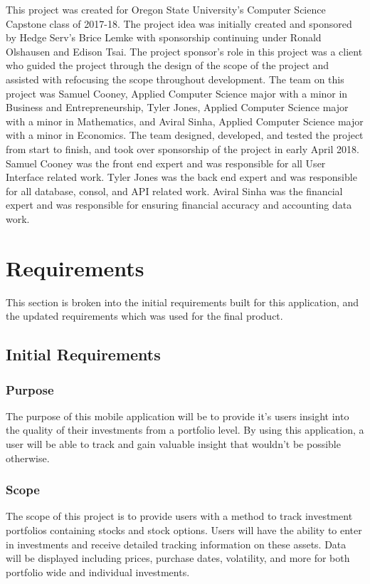 \documentclass[onecolumn, draftclsnofoot,10pt, compsoc]{IEEEtran}
\begin{document}
This project was created for Oregon State University's Computer Science Capstone class of 2017-18. The project idea was initially
created and sponsored by Hedge Serv's Brice Lemke with sponsorship continuing under Ronald Olshausen and Edison Tsai. The project sponsor's role
in  this project was a client who guided the project through the design of the scope of the project and assisted with
refocusing the scope throughout development. The team on this project was Samuel Cooney, Applied Computer Science
major with a minor in Business and Entrepreneurship, Tyler Jones, Applied Computer Science major with a minor in Mathematics, and Aviral Sinha, Applied Computer Science major with a minor in Economics.
The team designed, developed, and tested the project from start to finish, and took over sponsorship of the project in early April 2018.
Samuel Cooney was the front end expert and was responsible for all User Interface related work. Tyler Jones was the back end expert and was
responsible for all database, consol, and API related work. Aviral Sinha was the financial expert and was responsible for ensuring financial
accuracy and accounting data work. 

\section{Requirements}
This section is broken into the initial requirements built for this application, and the updated requirements which was used for the final product.
\subsection{Initial Requirements}
\subsubsection{Purpose}
The purpose of this mobile application will be to provide it's users insight into the quality of their investments from a portfolio level. 
By using this application, a user will be able to track and gain valuable insight that wouldn't be possible otherwise.

\subsubsection{Scope}
The scope  of this project is to provide users with a method to track investment portfolios containing stocks and stock options. Users will have
the ability  to enter in investments and receive detailed tracking information on these assets. Data will be displayed including prices, purchase
dates, volatility, and more for both portfolio wide and individual investments.
\end{document}
